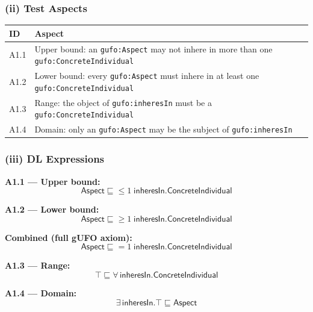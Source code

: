 \documentclass[12pt,a4paper]{article}
\newcommand{\gufoclass}[1]{\nolinkurl{gufo:#1}}
\newcommand{\gufoprop}[1]{\nolinkurl{gufo:#1}}
\begin{document}
\subsubsection*{(ii) Test Aspects}

\begin{tabular}{lL{10cm}}
  \toprule
  \textbf{ID} & \textbf{Aspect} \\
  \midrule
  A1.1 & Upper bound: an \gufoclass{Aspect} may not inhere in more than one
         \gufoclass{ConcreteIndividual} \\
  A1.2 & Lower bound: every \gufoclass{Aspect} must inhere in at least one
         \gufoclass{ConcreteIndividual} \\
  A1.3 & Range: the object of \gufoprop{inheresIn} must be a
         \gufoclass{ConcreteIndividual} \\
  A1.4 & Domain: only an \gufoclass{Aspect} may be the subject of
         \gufoprop{inheresIn} \\
  \bottomrule
\end{tabular}

\subsubsection*{(iii) DL Expressions}

\textbf{A1.1 --- Upper bound:}
\begin{equation*}
  \mathsf{Aspect} \sqsubseteq {\leq}1\;\mathsf{inheresIn}.\mathsf{ConcreteIndividual}
\end{equation*}

\textbf{A1.2 --- Lower bound:}
\begin{equation*}
  \mathsf{Aspect} \sqsubseteq {\geq}1\;\mathsf{inheresIn}.\mathsf{ConcreteIndividual}
\end{equation*}

\textbf{Combined (full gUFO axiom):}
\begin{equation*}
  \mathsf{Aspect} \sqsubseteq {=}1\;\mathsf{inheresIn}.\mathsf{ConcreteIndividual}
\end{equation*}

\textbf{A1.3 --- Range:}
\begin{equation*}
  \top \sqsubseteq \forall\,\mathsf{inheresIn}.\mathsf{ConcreteIndividual}
\end{equation*}

\textbf{A1.4 --- Domain:}
\begin{equation*}
  \exists\,\mathsf{inheresIn}.\top \sqsubseteq \mathsf{Aspect}
\end{equation*}
\end{document}
